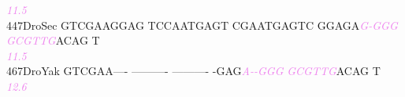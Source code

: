 \documentclass[11pt,twoside,reqno,a4paper]{article}
\begin{document}
{\hspace*{4\charwidth}\hspace*{7\charwidth}\hspace*{1\charwidth}\hspace*{1\charwidth}\hspace*{1\charwidth}\hspace*{35\charwidth}\textit{\textcolor{violet}{11.5}}\hspace*{1\charwidth}\hspace*{1\charwidth}\\
447\hspace*{1\charwidth}DroSec	GTCGAAGGAG	TCCAATGAGT	CGAATGAGTC	GGAGA\textit{\textcolor{violet}{G}}\textit{\textcolor{violet}{-}}\textit{\textcolor{violet}{G}}\textit{\textcolor{violet}{G}}\textit{\textcolor{violet}{G}}	\textit{\textcolor{violet}{G}}\textit{\textcolor{violet}{C}}\textit{\textcolor{violet}{G}}\textit{\textcolor{violet}{T}}\textit{\textcolor{violet}{T}}\textit{\textcolor{violet}{G}}ACAG	T\\
\hspace*{4\charwidth}\hspace*{7\charwidth}\hspace*{1\charwidth}\hspace*{1\charwidth}\hspace*{1\charwidth}\hspace*{35\charwidth}\textit{\textcolor{violet}{11.5}}\hspace*{1\charwidth}\hspace*{1\charwidth}\\
467\hspace*{1\charwidth}DroYak	GTCGAA----	----------	----------	-GAG\textit{\textcolor{violet}{A}}\textit{\textcolor{violet}{-}}\textit{\textcolor{violet}{-}}\textit{\textcolor{violet}{G}}\textit{\textcolor{violet}{G}}\textit{\textcolor{violet}{G}}	\textit{\textcolor{violet}{G}}\textit{\textcolor{violet}{C}}\textit{\textcolor{violet}{G}}\textit{\textcolor{violet}{T}}\textit{\textcolor{violet}{T}}\textit{\textcolor{violet}{G}}ACAG	T\\
\hspace*{4\charwidth}\hspace*{7\charwidth}\hspace*{1\charwidth}\hspace*{1\charwidth}\hspace*{1\charwidth}\hspace*{34\charwidth}\textit{\textcolor{violet}{12.6}}\hspace*{1\charwidth}\hspace*{1\charwidth}\\
}
\end{document}

